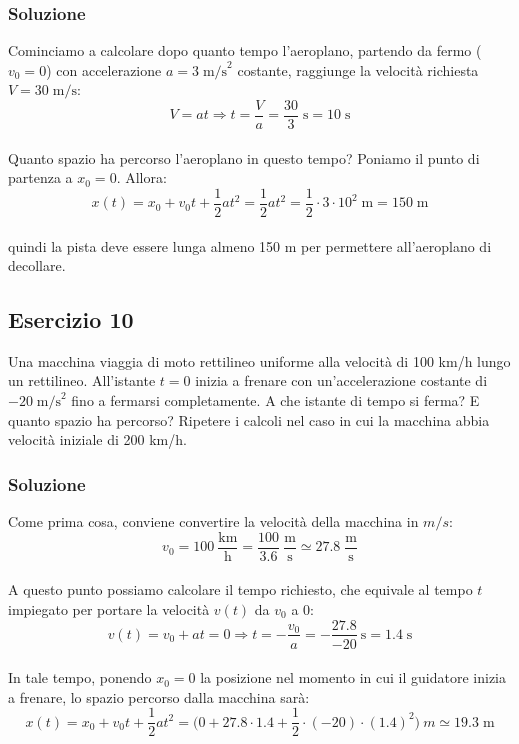 \documentclass[12pt,a4paper]{book}
\begin{document}
\subsubsection*{Soluzione}
Cominciamo a calcolare dopo quanto tempo l'aeroplano, partendo da fermo ($v_0=0$) con accelerazione $a=3 \; \text{m/s}^2$ costante, raggiunge la velocità richiesta $V = 30 \;\text{m/s}$:
\begin{equation*}
V=at \Longrightarrow t=\frac{V}{a}=\frac{30}{3}\; \text{s} = 10 \; \text{s}
\end{equation*}\\
Quanto spazio ha percorso l'aeroplano in questo tempo? Poniamo il punto di partenza a $x_0 = 0$. Allora:\\
\begin{equation*}
x(t)= x_0 + v_0  t + \frac{1}{2}a t^2 = \frac{1}{2}a  t^2 = \frac{1}{2}\cdot 3 \cdot 10^2 \; \text{m} = 150 \; \text{m}
\end{equation*}\\
quindi la pista deve essere lunga almeno 150 m per permettere all'aeroplano di decollare.\\


\subsection*{Esercizio 10}
Una macchina viaggia di moto rettilineo uniforme alla velocità di 100 km/h lungo un rettilineo. All'istante $t=0$ inizia a frenare con un'accelerazione costante di $-20\;\text{m/s}^2$  fino a fermarsi completamente. A che istante di tempo si ferma? E quanto spazio ha percorso? Ripetere i calcoli nel caso in cui la macchina abbia velocità iniziale di 200 km/h.

\subsubsection*{Soluzione}
Come prima cosa, conviene convertire la velocità della macchina in $m/s$:\\
\begin{equation*}
v_0=100 \: \frac{\text{km}}{\text{h}}= \frac{100}{3.6}\:\frac{\text{m}}{\text{s}}\simeq 27.8 \; \frac{\text{m}}{\text{s}}
\end{equation*}\\
A questo punto possiamo calcolare il tempo richiesto, che equivale al tempo $t$ impiegato per portare la velocità $v(t)$ da $v_0$ a $0$:\\
\begin{equation*}
v(t)=v_0+at=0 \Longrightarrow t= - \frac{v_0}{a}= -\frac{27.8}{-20} \: \text{s} = 1.4 \; \text{s}
\end{equation*}\\
In tale tempo, ponendo $x_0=0$ la posizione nel momento in cui il guidatore inizia a frenare, lo spazio percorso dalla macchina sarà:\\
\begin{equation*}
x(t)=x_0 + v_0 t + \frac{1}{2} a t^2 = \big(0 + 27.8 \cdot 1.4 + \frac{1}{2} \cdot (-20) \cdot (1.4)^2 \big) \: m \simeq 19.3 \; \text{m}
\end{equation*}\\
 
\end{document}
